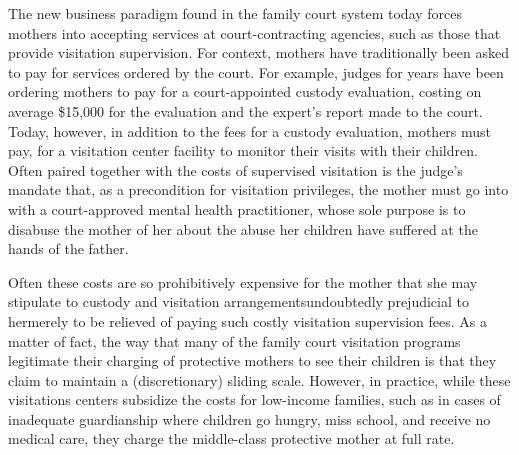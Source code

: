  


\noindent{}The new business paradigm found in the family court system today
forces mothers into accepting services at court-contracting agencies,
such as those that provide visitation supervision. For context, mothers have traditionally been asked to pay for services ordered by the
court. For example, judges for years have been ordering mothers to pay
for a court-appointed custody evaluation, costing on average \$15,000
for the evaluation and the expert's report made to the court. Today,
however, in addition to the fees for a custody evaluation, 
mothers must pay, for a visitation center facility to monitor their visits with their children. Often paired together with the costs of supervised visitation is
the judge's mandate that, as a precondition for visitation privileges, the
mother must go into  with a court-approved mental health
practitioner, whose sole purpose is to disabuse the mother of 
her  about the abuse her children 
have suffered at the hands of the father. \pfl{}

Often these costs are so prohibitively expensive for the mother that
she may stipulate to custody and visitation arrangements\mdash{}undoubtedly
prejudicial to her\mdash{}merely to be relieved of paying such costly 
visitation supervision fees. As a matter of fact, the way that many
of the family court visitation
programs legitimate their charging of protective mothers to see their
children is that they claim to maintain a (discretionary) sliding scale.
However, in practice, while these visitations centers subsidize the costs
for low-income families, such as in cases of inadequate guardianship
where children go hungry, miss school, and receive no medical care,
they charge the middle-class protective mother at full rate. \pfl{}


\vspace{2em}


